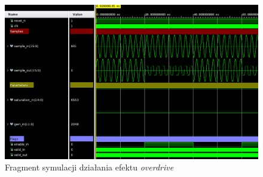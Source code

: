 \vspace{0.5cm}
\begin{figure}[ht]
    \centering
    \includegraphics[width=\textwidth]{img/sim/overdrive_sim.png}
    \captionsetup{format=plain,justification=centering}
    \caption{Fragment symulacji działania efektu \textit{overdrive}}
    \label{sim-overdrive}
\end{figure}
\vspace{0.5cm}